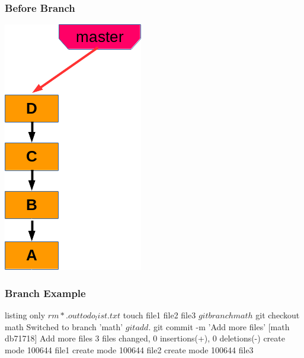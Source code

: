 \documentclass[english,compress]{beamer}
\begin{document}
\frame
{
    \frametitle{Before Branch}

	\begin{center}
		\includegraphics[height=.8\textheight]{figs/1-before-branch.png}
	\end{center}
}

\begin{frame}[fragile]
    \frametitle{Branch Example}
    \begin{tcblisting}{listing only}
$ rm *.out todo_list.txt
$ touch file1 file2 file3
$ git branch math
$ git checkout math
Switched to branch 'math'
$ git add .
$ git commit -m 'Add more files'
[math db71718] Add more files
 3 files changed, 0 insertions(+), 0 deletions(-)
 create mode 100644 file1
 create mode 100644 file2
 create mode 100644 file3
    \end{tcblisting}
\end{frame}
\end{document}
